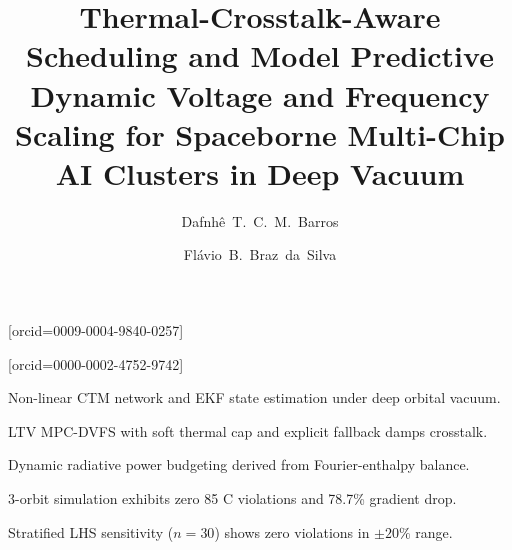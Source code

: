 \documentclass[a4paper,fleqn]{cas-dc}
\begin{document}
\let\WriteBookmarks\relax
\def\floatpagepagefraction{1}
\def\textpagefraction{.001}


\title[mode = title]{Thermal-Crosstalk-Aware Scheduling and Model Predictive Dynamic Voltage and Frequency Scaling for Spaceborne Multi-Chip AI Clusters in Deep Vacuum}  

\author[1]{Dafnh\^e~T.~C.~M.~Barros}[orcid=0009-0004-9840-0257]
\cormark[1]

\author[1]{Fl\'avio~B.~Braz~da~Silva}[orcid=0000-0002-4752-9742]



\begin{highlights}
\item Non-linear CTM network and EKF state estimation under deep orbital vacuum.
\item LTV MPC-DVFS with soft thermal cap and explicit fallback damps crosstalk.
\item Dynamic radiative power budgeting derived from Fourier-enthalpy balance.
\item 3-orbit simulation exhibits zero 85 C violations and 78.7\% gradient drop.
\item Stratified LHS sensitivity ($n=30$) shows zero violations in $\pm20\%$ range.
\end{highlights}
\end{document}
